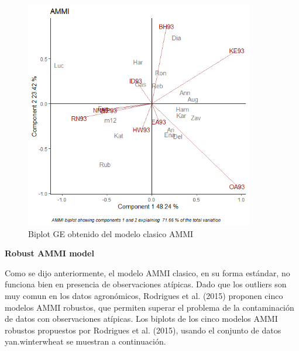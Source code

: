 \begin{figure}[h!]
	\begin{center}
		\includegraphics[width=10cm]{./Graficos/AMMI.png}
	\end{center}
	\caption{Biplot GE obtenido del modelo clasico AMMI}
\end{figure}

\textbf{Robust AMMI model}

Como se dijo anteriormente, el modelo AMMI clasico, en su forma estándar, no funciona bien en presencia de observaciones atípicas. Dado que los outliers son muy comun en los datos agronómicos, Rodrigues et al. (2015) proponen cinco modelos AMMI robustos, que permiten superar el problema de la contaminación de datos con observaciones atípicas. Los biplots de los cinco modelos AMMI robustos propuestos por Rodrigues et al. (2015), usando el conjunto de datos yan.winterwheat se muestran a continuación.


